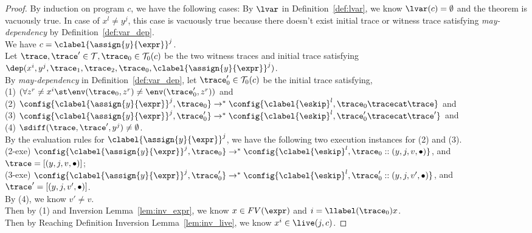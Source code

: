 \begin{proof}
  By induction on program $c$, we have the following cases:
  By $\lvar$ in Definition~\ref{def:lvar}, we know $\lvar(c) = \emptyset$ and the theorem is vacuously true.
  In case of $x^l \neq y^j$, this case is vacuously true because there doesn't 
  exist initial trace or witness trace satisfying \emph{may-dependency} by Definition~\ref{def:var_dep}.
  \\
  We have $c = \clabel{\assign{y}{\expr}}^j$.
  \\
  Let $\trace, \trace' \in \mathcal{T}, \trace_0 \in \mathcal{T}_0(c)$ be the two witness traces and initial trace satisfying 
  $\dep(x^i, y^j, \trace_1, \trace_2, \trace_0, \clabel{\assign{y}{\expr}}^j )$.
  \\
  By \emph{may-dependency} in Definition~\ref{def:var_dep},
  let $\trace_0' \in \mathcal{T}_0(c)$ be the initial trace satisfying,
  \\
  (1) $ (\forall z^r \neq x^i \st   \env(\trace_0, z^r ) \neq   \env(\trace_0',z^r) )$
  and \\
  (2) $\config{\clabel{\assign{y}{\expr}}^j , \trace_0} 
  \rightarrow^{*} \config{\clabel{\eskip}^l, \trace_0  \tracecat \trace } $ 
    and \\
  (3) $\config{\clabel{\assign{y}{\expr}}^j, \trace_0'} 
  \rightarrow^{*} \config{\clabel{\eskip}^l, \trace_0'  \tracecat \trace'}$ 
    and \\
    (4) $\sdiff(\trace, \trace', y^j ) \neq \emptyset$.
    \\
    By the evaluation rules for $\clabel{\assign{y}{\expr}}^j$, we have the following two execution instances for 
    (2) and (3).
    \\
    (2-exe) $\config{\clabel{\assign{y}{\expr}}^j , \trace_0} 
    \rightarrow^{*} \config{\clabel{\eskip}^l, \trace_0 :: (y,j, v, \bullet)  } $, and $\trace = [(y,j, v, \bullet)]$;
    \\
    (3-exe) $\config{\clabel{\assign{y}{\expr}}^j, \trace_0'} 
    \rightarrow^{*} \config{\clabel{\eskip}^l, \trace_0' :: (y,j, v', \bullet) }$,   and $\trace' = [(y,j, v', \bullet)]$.
    \\
    By (4), we know $v' \neq v$.
    \\
    Then by (1) and Inversion Lemma~\ref{lem:inv_expr}, we know $x \in FV(\expr)$ and $i = \llabel(\trace_0)x$.
    \\
    Then by Reaching Definition Inversion Lemma~\ref{lem:inv_live}, we know $x^i \in \live(j, c)$.

\end{proof}
